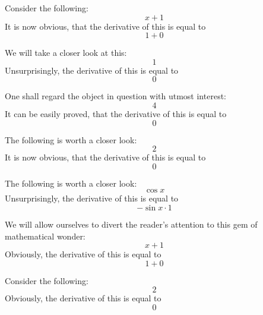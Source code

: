 \documentclass{article}
\begin{document}
Consider the following:
\begin{equation}
x + 1 
\end{equation}
It is now obvious, that the derivative of this is equal to
\begin{equation}
1 + 0 
\end{equation}

We will take a closer look at this:
\begin{equation}
1 
\end{equation}
Unsurprisingly, the derivative of this is equal to
\begin{equation}
0 
\end{equation}

One shall regard the object in question with utmost interest:
\begin{equation}
4 
\end{equation}
It can be easily proved, that the derivative of this is equal to
\begin{equation}
0 
\end{equation}

The following is worth a closer look:
\begin{equation}
2 
\end{equation}
It is now obvious, that the derivative of this is equal to
\begin{equation}
0 
\end{equation}

The following is worth a closer look:
\begin{equation}
\cos x 
\end{equation}
Unsurprisingly, the derivative of this is equal to
\begin{equation}
-\sin x \cdot 1 
\end{equation}

We will allow ourselves to divert the reader's attention to this gem of mathematical wonder:
\begin{equation}
x + 1 
\end{equation}
Obviously, the derivative of this is equal to
\begin{equation}
1 + 0 
\end{equation}

Consider the following:
\begin{equation}
2 
\end{equation}
Obviously, the derivative of this is equal to
\begin{equation}
0 
\end{equation}
\end{document}
